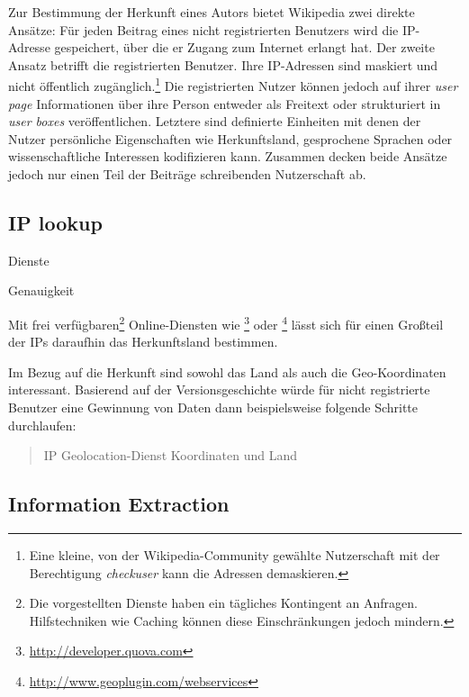 Zur Bestimmung der Herkunft eines Autors bietet Wikipedia zwei direkte Ansätze: 
Für jeden Beitrag eines nicht registrierten Benutzers wird die IP-Adresse gespeichert, über die er Zugang zum Internet erlangt hat. 
Der zweite Ansatz betrifft die registrierten Benutzer.
Ihre IP-Adressen sind maskiert und nicht öffentlich zugänglich.\footnote{Eine kleine, von der Wikipedia-Community gewählte Nutzerschaft mit der Berechtigung \emph{checkuser} kann die Adressen demaskieren.}
Die registrierten Nutzer können jedoch auf ihrer \emph{user page} Informationen über ihre Person entweder als Freitext oder strukturiert in \emph{user boxes} veröffentlichen.
Letztere sind definierte Einheiten mit denen der Nutzer persönliche Eigenschaften wie Herkunftsland, gesprochene Sprachen oder wissenschaftliche Interessen kodifizieren kann.
Zusammen decken beide Ansätze jedoch nur einen Teil der Beiträge schreibenden Nutzerschaft ab.


\subsection{IP lookup}

\begin{todos}
    \item Dienste
    \item Genauigkeit
\end{todos}

Mit frei verfügbaren\footnote{Die vorgestellten Dienste haben ein tägliches Kontingent an Anfragen. Hilfstechniken wie Caching können diese Einschränkungen jedoch mindern.} Online-Diensten wie \footnote{\url{http://developer.quova.com}} oder \footnote{\url{http://www.geoplugin.com/webservices}} lässt sich für einen Großteil der IPs daraufhin das Herkunftsland bestimmen.

Im Bezug auf die Herkunft sind sowohl das Land als auch die Geo-Koordinaten interessant.  
Basierend auf der Versionsgeschichte würde für nicht registrierte Benutzer eine Gewinnung von Daten dann beispielsweise folgende Schritte durchlaufen:

\begin{quotation}
IP \RA Geolocation-Dienst \RA Koordinaten und Land
\end{quotation}


\subsection{Information Extraction}

